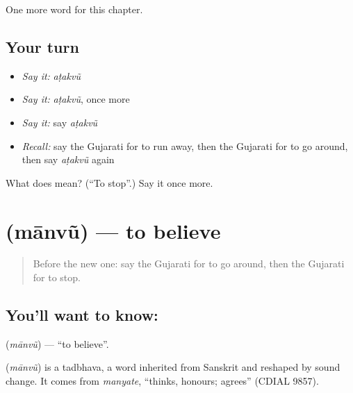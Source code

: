 \begin{grammarlens}[title={What you've built}]
One more word for this chapter.
\end{grammarlens}

\subsection*{Your turn}
\begin{itemize}
\raggedright
  \item \emph{Say it:} \emph{aṭakvũ}
  \item \emph{Say it:} \emph{aṭakvũ}, once more
  \item \emph{Say it:} say \emph{aṭakvũ}
  \item \emph{Recall:} say the Gujarati for to run away, then the Gujarati for to go around, then say \emph{aṭakvũ} again
\end{itemize}

\begin{tcolorbox}[breakable,colback=teal!4,colframe=teal!35!black,title={Before you move on}]
What does  mean? (\textquotedblleft{}To stop\textquotedblright{}.) Say it once more.
\end{tcolorbox}
\section[\texorpdfstring{\gu{માનવું} (mānvũ)}{માનવું (mānvũ)}]{ (mānvũ) — to believe}

\label{lesson:GU-C143-manvu}



\begin{quote}
Before the new one: say the Gujarati for to go around, then the Gujarati for to stop.
\end{quote}

\subsection*{You'll want to know: }
\textbf{} (\emph{mānvũ}) — \textquotedblleft{}to believe\textquotedblright{}.

\begin{cousinweb}
\textbf{} (\emph{mānvũ}) is a tadbhava, a word inherited from Sanskrit and reshaped by sound change. It comes from \emph{manyate}, \textquotedblleft{}thinks, honours; agrees\textquotedblright{} (CDIAL 9857).
\end{cousinweb}

